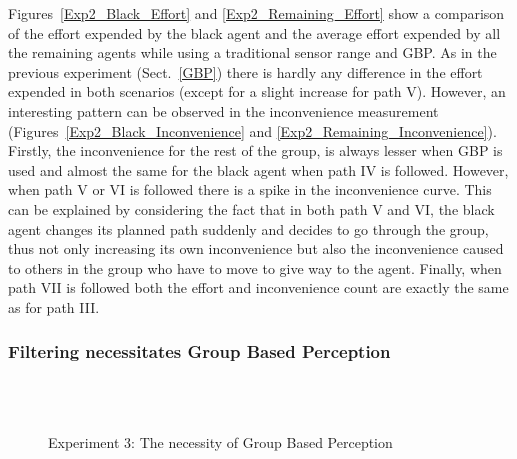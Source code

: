 Figures~\ref{Exp2_Black_Effort} and \ref{Exp2_Remaining_Effort} show a comparison of the effort expended by the black agent and the average effort expended by all the remaining agents while using a traditional sensor range and GBP. As in the previous experiment (Sect.~\ref{GBP}) there is hardly any difference in the effort expended in both scenarios (except for a slight increase for path V). However, an interesting pattern can be observed in the inconvenience measurement (Figures~\ref{Exp2_Black_Inconvenience} and \ref{Exp2_Remaining_Inconvenience}). Firstly, the inconvenience for the rest of the group, is always lesser when GBP is used and almost the same for the black agent when path IV is followed. However, when path V or VI is followed there is a spike in the inconvenience curve. This can be explained by considering the fact that in both path V and VI, the black agent changes its planned path suddenly and decides to go through the group, thus not only increasing its own inconvenience but also the inconvenience caused to others in the group who have to move to give way to the agent. Finally, when path VII is followed both the effort and inconvenience count are exactly the same as for path III.

\subsubsection{Filtering necessitates Group Based Perception}


\begin{figure}[!t]
  \centering
   \\
    \hspace{1pt}
  \\
  \hspace{1pt}
  \caption{Experiment 3: The necessity of Group Based Perception}
  \label{Exp3}
\end{figure}

